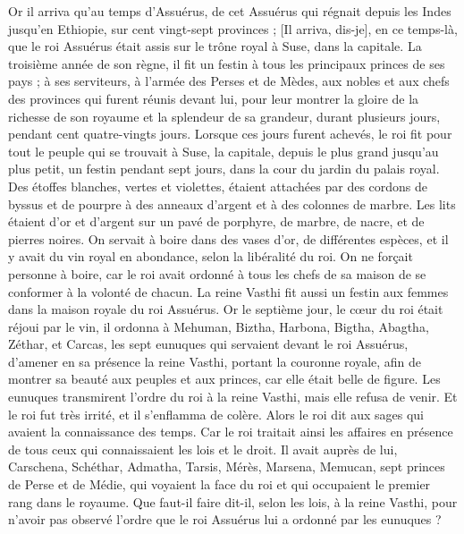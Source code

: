 \begin{multicols}{2}
\VerseOne{}Or il arriva qu’au temps d’Assuérus, de cet Assuérus qui régnait depuis les Indes jusqu'en Ethiopie, sur cent vingt-sept provinces ;
[Il arriva, dis-je], en ce temps-là, que le roi Assuérus était assis sur le trône royal à Suse, dans la capitale.
La troisième année de son règne, il fit un festin à tous les principaux princes de ses pays ; à ses serviteurs, à l’armée des Perses et de Mèdes, aux nobles et aux chefs des provinces qui furent réunis devant lui,
pour leur montrer la gloire de la richesse de son royaume et la splendeur de sa grandeur, durant plusieurs jours, pendant cent quatre-vingts jours.
Lorsque ces jours furent achevés, le roi fit pour tout le peuple qui se trouvait à Suse, la capitale, depuis le plus grand jusqu'au plus petit, un festin pendant sept jours, dans la cour du jardin du palais royal.
Des étoffes blanches, vertes et violettes, étaient attachées par des cordons de byssus et de pourpre à des anneaux d'argent et à des colonnes de marbre. Les lits étaient d'or et d'argent sur un pavé de porphyre, de marbre, de nacre, et de pierres noires.
On servait à boire dans des vases d'or, de différentes espèces, et il y avait du vin royal en abondance, selon la libéralité du roi.
On ne forçait personne à boire, car le roi avait ordonné à tous les chefs de sa maison de se conformer à la volonté de chacun.
La reine Vasthi fit aussi un festin aux femmes dans la maison royale du roi Assuérus.
Or le septième jour, le cœur du roi était réjoui par le vin, il ordonna à Mehuman, Biztha, Harbona, Bigtha, Abagtha, Zéthar, et Carcas, les sept eunuques qui servaient devant le roi Assuérus,
d’amener en sa présence la reine Vasthi, portant la couronne royale, afin de montrer sa beauté aux peuples et aux princes, car elle était belle de figure.
Les eunuques transmirent l’ordre du roi à la reine Vasthi, mais elle refusa de venir. Et le roi fut très irrité, et il s’enflamma de colère.
Alors le roi dit aux sages qui avaient la connaissance des temps. Car le roi traitait ainsi les affaires en présence de tous ceux qui connaissaient les lois et le droit.
Il avait auprès de lui, Carschena, Schéthar, Admatha, Tarsis, Mérès, Marsena, Memucan, sept princes de Perse et de Médie, qui voyaient la face du roi et qui occupaient le premier rang dans le royaume.
Que faut-il faire dit-il, selon les lois, à la reine Vasthi, pour n'avoir pas observé l’ordre que le roi Assuérus lui a ordonné par les eunuques ?

\end{multicols}
